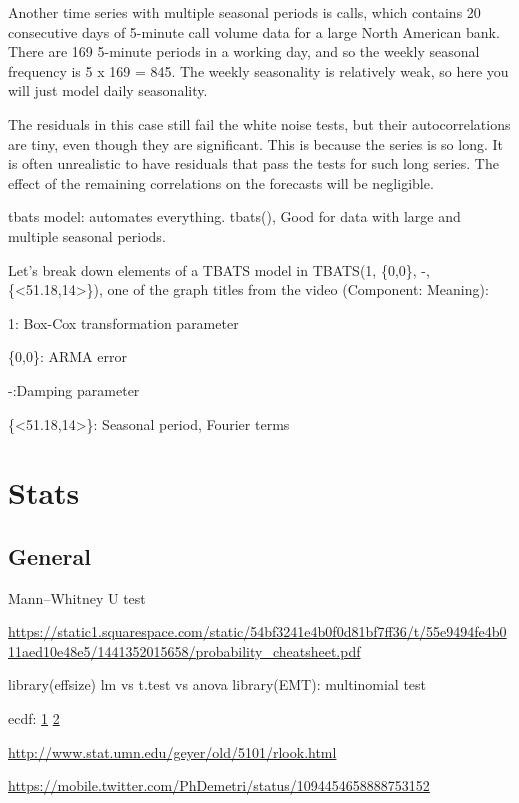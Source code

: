 \documentclass[]{book}
\begin{document}
Another time series with multiple seasonal periods is calls, which
contains 20 consecutive days of 5-minute call volume data for a large
North American bank. There are 169 5-minute periods in a working day,
and so the weekly seasonal frequency is 5 x 169 = 845. The weekly
seasonality is relatively weak, so here you will just model daily
seasonality.

The residuals in this case still fail the white noise tests, but their
autocorrelations are tiny, even though they are significant. This is
because the series is so long. It is often unrealistic to have residuals
that pass the tests for such long series. The effect of the remaining
correlations on the forecasts will be negligible.

tbats model: automates everything. tbats(), Good for data with large and
multiple seasonal periods.

Let's break down elements of a TBATS model in TBATS(1, \{0,0\}, -,
\{\textless{}51.18,14\textgreater{}\}), one of the graph titles from the
video (Component: Meaning):

1: Box-Cox transformation parameter

\{0,0\}: ARMA error

-:Damping parameter

\{\textless{}51.18,14\textgreater{}\}: Seasonal period, Fourier terms

\chapter{Stats}\label{stats}

\section{General}\label{general-4}

Mann--Whitney U test

\url{https://static1.squarespace.com/static/54bf3241e4b0f0d81bf7ff36/t/55e9494fe4b011aed10e48e5/1441352015658/probability_cheatsheet.pdf}

library(effsize) lm vs t.test vs anova library(EMT): multinomial test

ecdf: \href{http://www.ericmjl.com/blog/2018/7/14/ecdfs/}{1} \textbar{}
\href{https://www.rdocumentation.org/packages/stats/versions/3.4.3/topics/ecdf}{2}

\url{http://www.stat.umn.edu/geyer/old/5101/rlook.html}

\url{https://mobile.twitter.com/PhDemetri/status/1094454658888753152}
\end{document}
